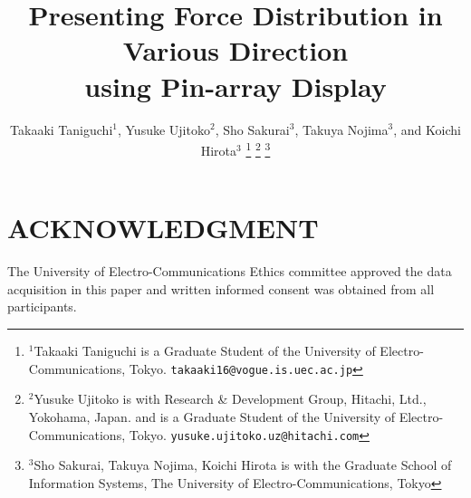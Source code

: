 \documentclass[letterpaper, 10 pt, conference]{ieeeconf}  %
\title{\LARGE \bf Presenting Force Distribution in Various Direction \\ using Pin-array Display}
\author{Takaaki Taniguchi$^{1}$, Yusuke Ujitoko$^{2}$, Sho Sakurai$^{3}$, Takuya Nojima$^{3}$, and Koichi Hirota$^{3}$%
\thanks{$^{1}$Takaaki Taniguchi is a Graduate Student of the University of Electro-Communications, Tokyo.
        {\tt\small takaaki16@vogue.is.uec.ac.jp}}%
\thanks{$^{2}$Yusuke Ujitoko is with Research \& Development Group, Hitachi, Ltd., Yokohama, Japan. and is a Graduate Student of the University of Electro-Communications, Tokyo.
        {\tt\small yusuke.ujitoko.uz@hitachi.com}}%
\thanks{$^{3}$Sho Sakurai, Takuya Nojima, Koichi Hirota is with the Graduate School of Information Systems, The University of Electro-Communications, Tokyo}}
\begin{document}
\maketitle
\thispagestyle{empty}
\pagestyle{empty}


\begin{abstract}

\end{abstract}
















\addtolength{\textheight}{-12cm}   %









\section*{ACKNOWLEDGMENT}

The University of Electro-Communications Ethics committee approved the data acquisition in this paper and written informed consent was obtained from all participants.



\end{document}
